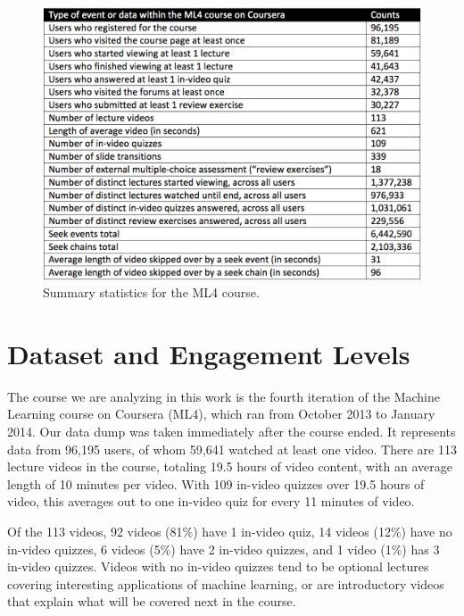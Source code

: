 \documentclass{sigchi}
\begin{document}
\begin{figure}
\includegraphics[width=1.0\columnwidth]{summary-statistics}
\caption{Summary statistics for the ML4 course.}
\label{fig:summary-statistics}
\end{figure}

\section{Dataset and Engagement Levels}

The course we are analyzing in this work is the fourth iteration of the Machine Learning course on Coursera (ML4), which ran from October 2013 to January 2014. Our data dump was taken immediately after the course ended. It represents data from 96,195 users, of whom 59,641 watched at least one video. There are 113 lecture videos in the course, totaling 19.5 hours of video content, with an average length of 10 minutes per video.  With 109  in-video quizzes over 19.5 hours of video, this averages out to one in-video quiz for every 11 minutes of video.

Of the 113 videos, 92 videos (81\%) have 1 in-video quiz, 14 videos (12\%) have no in-video quizzes, 6 videos (5\%) have 2 in-video quizzes, and 1 video (1\%) has 3 in-video quizzes. Videos with no in-video quizzes tend to be optional lectures covering interesting applications of machine learning, or are introductory videos that explain what will be covered next in the course. %
\end{document}
